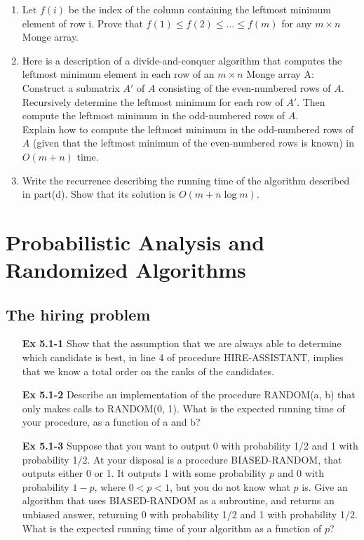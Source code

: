 \documentclass[fontsize=12pt,paper=a4]{book}
\begin{document}
\begin{enumerate}
\begin{enumerate}
        \item Let $f(i)$ be the index of the column containing the leftmost minimum element of row i. Prove that $f(1) \leq f(2) \leq \dots \leq f(m)$ for any $m \times n$ Monge array.
        \item Here is a description of a divide-and-conquer algorithm that computes the leftmost minimum element in each row of an $m \times n$ Monge array A:\\
              Construct a submatrix $A'$ of $A$ consisting of the even-numbered rows of $A$. Recursively determine the leftmost minimum for each row of $A'$. Then compute the leftmost minimum in the odd-numbered rows of $A$.\\
              Explain how to compute the leftmost minimum in the odd-numbered rows of $A$
              (given that the leftmost minimum of the even-numbered rows is known) in $O(m + n)$ time.
        \item Write the recurrence describing the running time of the algorithm described in part(d). Show that its solution is $O(m + n \log m)$.
       \end{enumerate}
       
\end{enumerate}

\chapter{Probabilistic Analysis and Randomized Algorithms}

\section{The hiring problem}
\begin{enumerate}
 \item[\textbf{Ex 5.1-1}]
       Show that the assumption that we are always able to determine which candidate is best, in line 4 of procedure HIRE-ASSISTANT, implies that we know a total order on the ranks of the candidates.
       
 \item[\textbf{Ex 5.1-2}]
       Describe an implementation of the procedure RANDOM(a, b) that only makes calls to RANDOM(0, 1). What is the expected running time of your procedure, as a function of a and b?
       
 \item[\textbf{Ex 5.1-3}]
       Suppose that you want to output 0 with probability 1/2 and 1 with probability 1/2. At your disposal is a procedure BIASED-RANDOM, that outputs either 0 or 1. It outputs 1 with some probability $p$ and 0 with probability $1 - p$, where $0 < p < 1$, but you do not know what $p$ is. Give an algorithm that uses BIASED-RANDOM as a subroutine, and returns an unbiased answer, returning 0 with probability 1/2 and 1 with probability 1/2. What is the expected running time of your algorithm as a function of $p$?
       
\end{enumerate}
\end{document}
